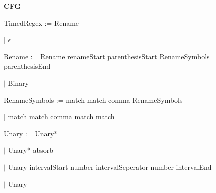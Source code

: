 
\textbf{CFG}

TimedRegex := Rename

\qquad	$\mid$ $\epsilon$

Rename := Rename renameStart parenthesisStart RenameSymbols parenthesisEnd

\qquad $\mid$ Binary

RenameSymbols := match match comma RenameSymbols

\qquad $\mid$ match match comma match match

Unary := Unary*

\qquad $\mid$ Unary* absorb

\qquad $\mid$ Unary intervalStart number intervalSeperator number intervalEnd

\qquad $\mid$ Unary 
